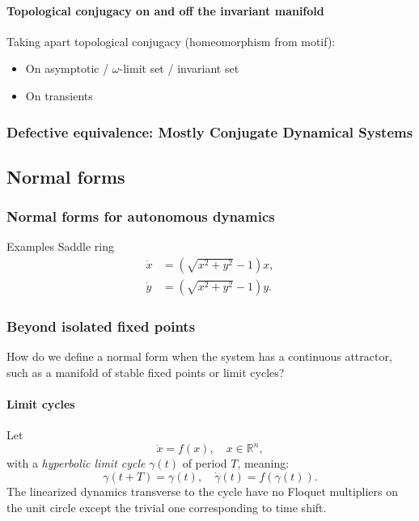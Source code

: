 \documentclass{article}
\theoremstyle{definition} \newtheorem{definition}{Definition}  \newtheorem{example}{Example}
\theoremstyle{remark} \newtheorem{remark}{Remark}
\newcounter{ct}
\begin{document}
\paragraph{Topological conjugacy on and off the invariant manifold}
Taking apart topological conjugacy (homeomorphism from motif):
\begin{itemize}
\item On asymptotic / $\omega$-limit set / invariant set
\item On transients \citep{koch2024biological}
\end{itemize}


\subsubsection{Defective equivalence: Mostly Conjugate Dynamical Systems}
\citep{skufca2007relaxing, skufca2008mostlyconjugate, bollt2010comparing}



\subsection{Normal forms}

\subsubsection{Normal forms for autonomous dynamics}%
Examples
Saddle ring
\begin{equation}
\begin{aligned}
\dot{x} &= (\sqrt{x^2 + y^2} - 1) x, \\
\dot{y} &= (\sqrt{x^2 + y^2} - 1) y.
\end{aligned}
\end{equation}


\subsubsection{Beyond isolated fixed points}
How do we define a normal form when the system has a continuous attractor, such as a manifold of stable fixed points or limit cycles?

\paragraph{Limit cycles}%
Let 
\[
\dot{x} = f(x), \quad x \in \mathbb{R}^n,
\]
with a \emph{hyperbolic limit cycle} \( \gamma(t) \) of period \( T \), meaning:
\[
\gamma(t + T) = \gamma(t), \quad \dot{\gamma}(t) = f(\gamma(t)).
\]
The linearized dynamics transverse to the cycle have no Floquet multipliers on the unit circle except the trivial one corresponding to time shift.
\end{document}

